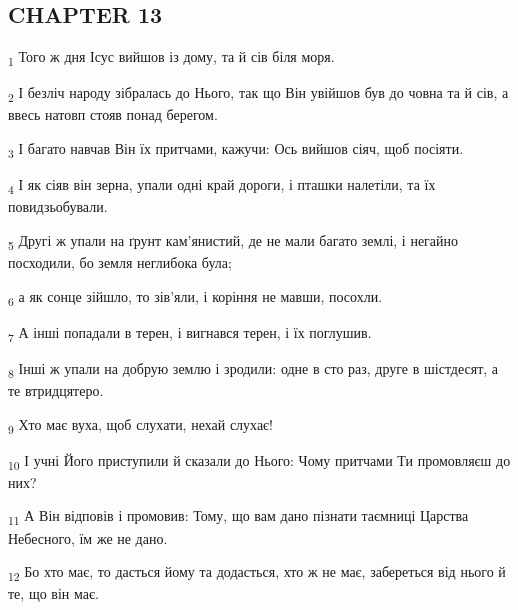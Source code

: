 \subsection{CHAPTER 13}
\begin{tcolorbox}
\textsubscript{1} Того ж дня Ісус вийшов із дому, та й сів біля моря.
\end{tcolorbox}
\begin{tcolorbox}
\textsubscript{2} І безліч народу зібралась до Нього, так що Він увійшов був до човна та й сів, а ввесь натовп стояв понад берегом.
\end{tcolorbox}
\begin{tcolorbox}
\textsubscript{3} І багато навчав Він їх притчами, кажучи: Ось вийшов сіяч, щоб посіяти.
\end{tcolorbox}
\begin{tcolorbox}
\textsubscript{4} І як сіяв він зерна, упали одні край дороги, і пташки налетіли, та їх повидзьобували.
\end{tcolorbox}
\begin{tcolorbox}
\textsubscript{5} Другі ж упали на ґрунт кам'янистий, де не мали багато землі, і негайно посходили, бо земля неглибока була;
\end{tcolorbox}
\begin{tcolorbox}
\textsubscript{6} а як сонце зійшло, то зів'яли, і коріння не мавши, посохли.
\end{tcolorbox}
\begin{tcolorbox}
\textsubscript{7} А інші попадали в терен, і вигнався терен, і їх поглушив.
\end{tcolorbox}
\begin{tcolorbox}
\textsubscript{8} Інші ж упали на добрую землю і зродили: одне в сто раз, друге в шістдесят, а те втридцятеро.
\end{tcolorbox}
\begin{tcolorbox}
\textsubscript{9} Хто має вуха, щоб слухати, нехай слухає!
\end{tcolorbox}
\begin{tcolorbox}
\textsubscript{10} І учні Його приступили й сказали до Нього: Чому притчами Ти промовляєш до них?
\end{tcolorbox}
\begin{tcolorbox}
\textsubscript{11} А Він відповів і промовив: Тому, що вам дано пізнати таємниці Царства Небесного, їм же не дано.
\end{tcolorbox}
\begin{tcolorbox}
\textsubscript{12} Бо хто має, то дасться йому та додасться, хто ж не має, забереться від нього й те, що він має.
\end{tcolorbox}
